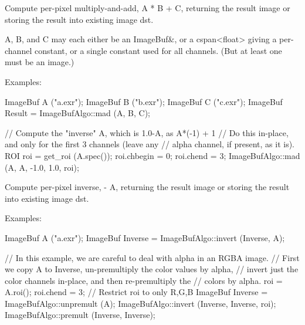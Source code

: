  

Compute per-pixel multiply-and-add, {\cf A * B + C}, returning the result image
or storing the result into existing image {\cf dst}.

{\cf A}, {\cf B}, and {\cf C} may each either be an {\cf ImageBuf\&}, or a
{\cf cspan<float>} giving a per-channel constant, or a single constant used
for all channels. (But at least one must be an image.)

\smallskip
\noindent Examples:
\begin{code}
    ImageBuf A ("a.exr");
    ImageBuf B ("b.exr");
    ImageBuf C ("c.exr");
    ImageBuf Result = ImageBufAlgo::mad (A, B, C);

    // Compute the "inverse" A, which is 1.0-A, as A*(-1) + 1
    // Do this in-place, and only for the first 3 channels (leave any
    // alpha channel, if present, as it is).
    ROI roi = get_roi (A.spec());
    roi.chbegin = 0;  roi.chend = 3;
    ImageBufAlgo::mad (A, A, -1.0, 1.0, roi);
\end{code}
\apiend


 

Compute per-pixel inverse, { - A}, returning the result image
or storing the result into existing image {\cf dst}.

\smallskip
\noindent Examples:
\begin{code}
    ImageBuf A ("a.exr");
    ImageBuf Inverse = ImageBufAlgo::invert (Inverse, A);

    // In this example, we are careful to deal with alpha in an RGBA image.
    // First we copy A to Inverse, un-premultiply the color values by alpha,
    // invert just the color channels in-place, and then re-premultiply the
    // colors by alpha.
    roi = A.roi();
    roi.chend = 3;      // Restrict roi to only R,G,B
    ImageBuf Inverse = ImageBufAlgo::unpremult (A);
    ImageBufAlgo::invert (Inverse, Inverse, roi);
    ImageBufAlgo::premult (Inverse, Inverse);
\end{code}

